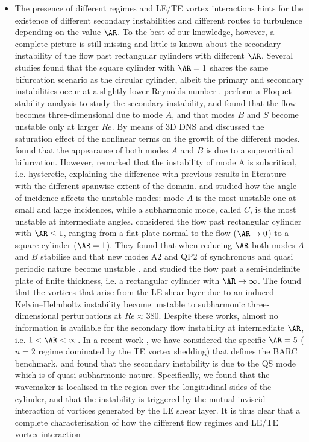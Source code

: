 \documentclass[onecolumn,notitlepage,superscriptaddress, amsmath,amssymb,longbibliographyaps,floatfix]{revtex4-1}
\begin{document}
\begin{itemize}
\item The presence of different regimes and LE/TE vortex interactions hints for the existence of different secondary instabilities and different routes to turbulence depending on the value $\AR$. To the best of our knowledge, however, a complete picture is still missing and little is known about the secondary instability of the flow past rectangular cylinders with different $\AR$. Several studies found that the square cylinder with $\AR=1$ shares the same bifurcation scenario as the circular cylinder, albeit the primary and secondary instabilities occur at a slightly lower Reynolds number \citep[see for example][]{jiang-cheng-2008,blackburn-sheard-2010}. \cite{balachandar-vanka-1999,blackburn-lopez-2003,sheard-fitzgerald-ryan-2009,blackburn-sheard-2010} perform a Floquet stability analysis to study the secondary instability, and found that the flow becomes three-dimensional due to mode $A$, and that modes $B$ and $S$ become unstable only at larger $Re$. By means of 3D DNS \cite{sheard-etal-2009} and \cite{jiang-chen-an-2018} discussed the saturation effect of the nonlinear terms on the growth of the different modes. \cite{sheard-etal-2009} found that the appearance of both modes $A$ and $B$ is due to a supercritical bifurcation. However, \cite{jiang-chen-an-2018} remarked that the instability of mode A is subcritical, i.e. hysteretic, explaining the difference with previous results in literature with the different spanwise extent of the domain. \cite{sheard-etal-2009} and \cite{sheard-2011} studied how the angle of incidence affects the unstable modes: mode $A$ is the most unstable one at small and large incidences, while a subharmonic mode, called $C$, is the most unstable at intermediate angles. \cite{choi-yang-2013} considered the flow past rectangular cylinder with $\AR \le 1$, ranging from a flat plate normal to the flow ($\AR \rightarrow 0$) to a square cylinder ($\AR=1$). They found that when reducing $\AR$ both modes $A$ and $B$ stabilise and that new modes A2 and QP2 of synchronous and quasi periodic nature become unstable \citep[see also][]{thompson-etal-2006}. \cite{chaurasia-thompson-2001} and \cite{huang-etal-2017} studied the flow past a semi-indefinite plate of finite thickness, i.e. a rectangular cylinder with $\AR \rightarrow \infty$. The found that the vortices that arise from the LE shear layer due to an induced Kelvin--Helmholtz instability become unstable to subharmonic three-dimensional perturbations at $Re \approx 380$. Despite these works, almost no information is available for the secondary flow instability at intermediate $\AR$, i.e. $1 < \AR < \infty$. In a recent work \citep{chiarini-quadrio-auteri-2022d}, we have considered the specific $\AR=5$ ($n=2$ regime dominated by the TE vortex shedding) that defines the BARC benchmark, and found that the secondary instability is due to the QS mode which is of quasi subharmonic nature. Specifically, we found that the wavemaker is localised in the region over the longitudinal sides of the cylinder, and that the instability is triggered by the mutual inviscid interaction of vortices generated by the LE shear layer. It is thus clear that a complete characterisation of how the different flow regimes and LE/TE vortex interaction 
\end{itemize}
\end{document}
